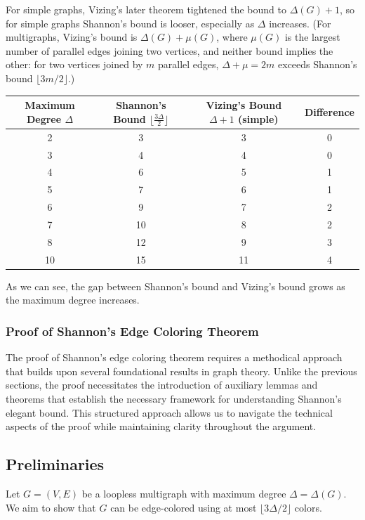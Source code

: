 \documentclass{article}
\theoremstyle{definition}
\begin{document}
For simple graphs, Vizing's later theorem tightened the bound to $\Delta(G) + 1$, so for simple graphs Shannon's bound is looser, especially as $\Delta$ increases. (For multigraphs, Vizing's bound is $\Delta(G) + \mu(G)$, where $\mu(G)$ is the largest number of parallel edges joining two vertices, and neither bound implies the other: for two vertices joined by $m$ parallel edges, $\Delta + \mu = 2m$ exceeds Shannon's bound $\lfloor 3m/2 \rfloor$.)

\begin{center}
\begin{tabular}{|c|c|c|c|}
\hline
Maximum Degree $\Delta$ & Shannon's Bound $\lfloor\frac{3\Delta}{2}\rfloor$ & Vizing's Bound $\Delta + 1$ (simple) & Difference \\
\hline
2 & 3 & 3 & 0 \\
3 & 4 & 4 & 0 \\
4 & 6 & 5 & 1 \\
5 & 7 & 6 & 1 \\
6 & 9 & 7 & 2 \\
7 & 10 & 8 & 2 \\
8 & 12 & 9 & 3 \\
10 & 15 & 11 & 4 \\
\hline
\end{tabular}
\end{center}

As we can see, the gap between Shannon's bound and Vizing's bound grows as the maximum degree increases.

\subsubsection{Proof of Shannon's Edge Coloring Theorem}
The proof of Shannon's edge coloring theorem requires a methodical approach that builds upon several foundational results in graph theory. Unlike the previous sections, the proof necessitates the introduction of auxiliary lemmas and theorems that establish the necessary framework for understanding Shannon's elegant bound. This structured approach allows us to navigate the technical aspects of the proof while maintaining clarity throughout the argument.

\subsection* {Preliminaries}
Let $G = (V, E)$ be a loopless multigraph with maximum degree $\Delta = \Delta(G)$. We aim to show that $G$ can be edge-colored using at most $\lfloor 3\Delta/2 \rfloor$ colors.
\end{document}
